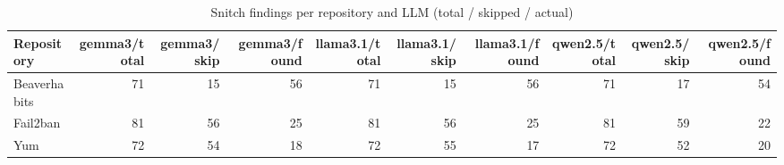 \begin{table}[htbp]
\centering
\begin{tabular}{lrrrrrrrrr}
\hline
Repository & gemma3/total & gemma3/skip & gemma3/found & llama3.1/total & llama3.1/skip & llama3.1/found & qwen2.5/total & qwen2.5/skip & qwen2.5/found \\
\hline
Beaverhabits & 71 & 15 & 56 & 71 & 15 & 56 & 71 & 17 & 54 \\
Fail2ban & 81 & 56 & 25 & 81 & 56 & 25 & 81 & 59 & 22 \\
Yum & 72 & 54 & 18 & 72 & 55 & 17 & 72 & 52 & 20 \\
\hline
\end{tabular}
\caption{Snitch findings per repository and LLM (total / skipped / actual)}
\label{tab:snitch_findings}
\end{table}
